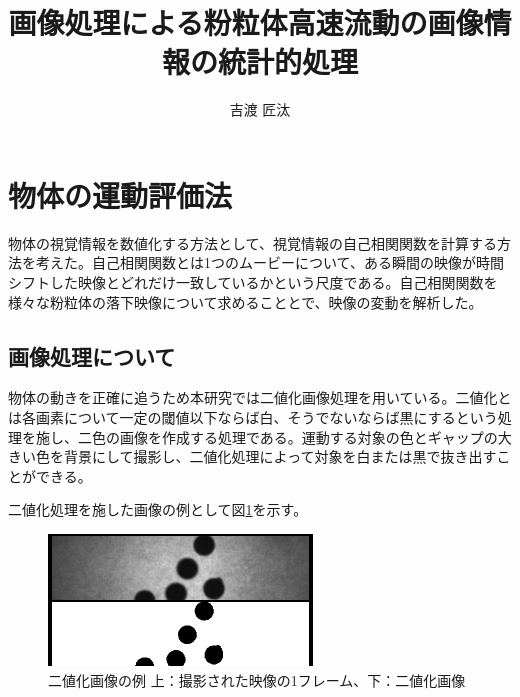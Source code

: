 \documentclass[a4paper,10pt,twocolumn,dvipdfmx]{jsarticle}
\title{画像処理による粉粒体高速流動の画像情報の統計的処理}
\author{吉渡 匠汰}
\date{ } %
\begin{document}

\section{物体の運動評価法}
物体の視覚情報を数値化する方法として、視覚情報の自己相関関数を計算する方法を考えた。自己相関関数とは1つのムービーについて、ある瞬間の映像が時間シフトした映像とどれだけ一致しているかという尺度である。自己相関関数を様々な粉粒体の落下映像について求めることとで、映像の変動を解析した。
\subsection{画像処理について}
物体の動きを正確に追うため本研究では二値化画像処理を用いている。二値化とは各画素について一定の閾値以下ならば白、そうでないならば黒にするという処理を施し、二色の画像を作成する処理である。運動する対象の色とギャップの大きい色を背景にして撮影し、二値化処理によって対象を白または黒で抜き出すことができる。 \par
二値化処理を施した画像の例として図\ref{fig:threshold}を示す。
\begin{figure}[H]
	\includegraphics[clip,width=7.0cm]{bb_image.png}
	\caption{二値化画像の例 上：撮影された映像の1フレーム、下：二値化画像}
	\label{fig:threshold}
\end{figure}
\end{document}

